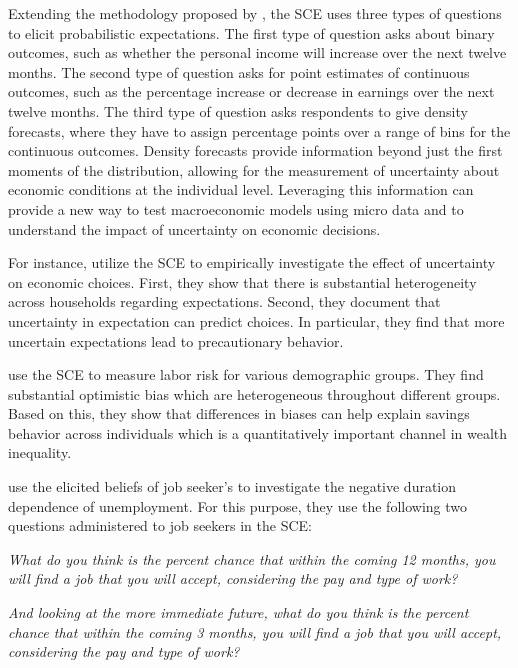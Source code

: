\documentclass[11pt,a4paper,leqno]{article}
\begin{document}
Extending the methodology proposed by \textcite{Manski}, the SCE uses three types of questions to elicit probabilistic expectations. The first type of question asks about binary outcomes, such as whether the personal income will increase over the next twelve months. The second type of question asks for point estimates of continuous outcomes, such as the percentage increase or decrease in earnings over the next twelve months. The third type of question asks respondents to give density forecasts, where they have to assign percentage points over a range of bins for the continuous outcomes. Density forecasts provide information beyond just the first moments of the distribution, allowing for the measurement of uncertainty about economic conditions at the individual level. Leveraging this information can provide a new way to test macroeconomic models using micro data and to understand the impact of uncertainty on economic decisions. 

For instance, \textcite{BFKL2018} utilize the SCE to empirically investigate the effect of uncertainty on economic choices. First, they show that there is substantial heterogeneity across households regarding expectations. Second, they document that uncertainty in expectation can predict choices. In particular, they find that more uncertain expectations lead to precautionary behavior. 

\textcite{Baleer2021} use the SCE to measure labor risk for various demographic groups. They find substantial optimistic bias which are heterogeneous throughout different groups. Based on this, they show that differences in biases can help explain savings behavior across individuals which is a quantitatively important channel in wealth inequality. 

\textcite{MST2021} use the elicited beliefs of job seeker's to investigate the negative duration dependence of unemployment. For this purpose, they use the following two questions administered to job seekers in the SCE:
\begin{center}
	\textit{What do you think is the percent chance that within the coming 12 months, you will find a job that you will accept, considering the pay and type of work?}
	\bigskip
	
	\textit{And looking at the more immediate future, what do you think is the percent chance that within the coming 3 months, you will find a job that you will accept, considering the pay and type of work?}
\end{center}
\end{document}
